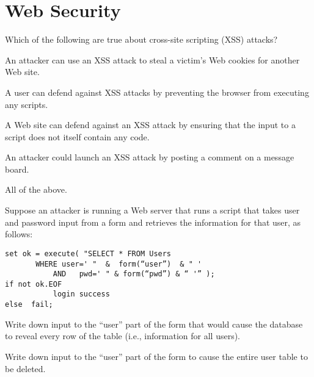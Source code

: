 \pagebreak
\section{Web Security}

Which of the following are true about cross-site scripting (XSS) attacks?
\allapply

\setcounter{partctr}{0}
\begin{list}{\bf{}.}{}
\item An attacker can use an XSS attack to steal a victim's Web cookies
  for another Web site.
\item A user can defend against XSS attacks by preventing the browser
  from executing any scripts.
\item A Web site can defend against an XSS attack by ensuring that the
  input to a script does not itself contain any code.
\item An attacker could launch an XSS attack by posting a comment on a
  message board.
\item All of the above.
\end{list}
\eprob


 Suppose an attacker is running a Web server that runs a script
that takes user and password input from a form and retrieves the
information for that user, as follows:

\begin{verbatim}
set ok = execute( "SELECT * FROM Users
	   WHERE user=' "  &  form(“user”)  & " ' 
           AND   pwd=' " & form(“pwd”) & “ '” );
if not ok.EOF   
           login success  
else  fail;
\end{verbatim}

\setcounter{partctr}{0}
\begin{list}{\bf{}.}{}
\item Write down input to the ``user'' part of the form that would
  cause the database to reveal every row of the table (i.e., information
  for all users).
\item Write down input to the ``user'' part of the form to cause the
  entire user table to be deleted.
\end{list}
\eprob
~\ansbelow



